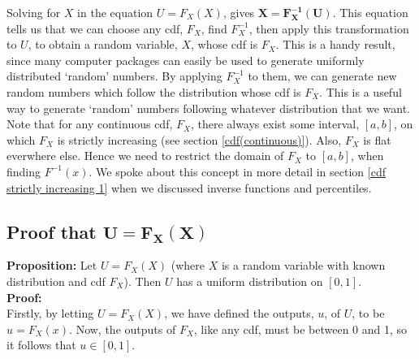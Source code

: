 \noindent Solving for $X$ in the equation $U = F_X(X)$, gives $\boldsymbol{X = F^{-1}_X(U)}$. This equation tells us that we can choose any cdf, $F_X$, find $F^{-1}_X$, then apply this transformation to $U$, to obtain a random variable, $X$, whose cdf is $F_X$. This is a handy result, since many computer packages can easily be used to generate uniformly distributed `random' numbers. By applying $F^{-1}_X$ to them, we can generate new random numbers which follow the distribution whose cdf is $F_X$. This is a useful way to generate `random' numbers following whatever distribution that we want. \\

\noindent Note that for any continuous cdf, $F_X$, there always exist some interval, $[a,b]$, on which $F_X$ is strictly increasing (see section \ref{cdf(continuous)}). Also, $F_X$ is flat everwhere else. Hence we need to restrict the domain of $F_X$ to $[a,b]$, when finding $F^{-1}(x)$. We spoke about this concept in more detail in section \ref{cdf strictly increasing 1} when we discussed inverse functions and percentiles.
\subsection{Proof that $\boldsymbol{U = F_X(X)}$}
\noindent \textbf{Proposition:} Let $U = F_X(X)$ (where $X$ is a random variable with known distribution and cdf $F_X$). Then $U$ has a uniform distribution on $[0,1]$. \\

\noindent \textbf{Proof:} \\
Firstly, by letting $U = F_X(X)$, we have defined the outputs, $u$, of $U$, to be $u = F_X(x)$. Now, the outputs of $F_X$, like any cdf, must be between 0 and 1, so it follows that $u \in [0,1]$. \\

